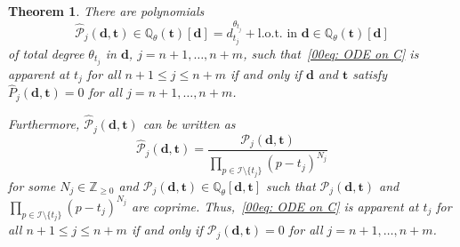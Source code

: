 \documentclass[10pt,a4paper]{amsart}
\numberwithin{equation}{section}
\newtheorem{Theorem}{Theorem}[section]
\def\Q{\mathbb Q}
\def\bt{\boldsymbol t}
\begin{document}
\begin{Theorem} \label{prop: apparent}
 There are polynomials
 \[
 \hat{\mathcal{P}}_j(\boldsymbol d,\boldsymbol t)\in\Q_\theta(\bt)[\boldsymbol d]=d_{t_{j}}^{\theta_{t_j}}+ \text{l.o.t.\ in $\boldsymbol d$} \in \Q_\theta(\boldsymbol t)[\boldsymbol d]
 \]
 of total degree $\theta_{t_j}$ in $\boldsymbol d$, $j=n+1,\dots,n+m$,
 such that~\eqref{00eq: ODE on C}
 is apparent at $t_j$ for all $n+1\leq j\leq n+m$ if
 and only if $\boldsymbol{d}$ and $\bt$ satisfy $\hat{P}_j(\boldsymbol{d},\bt)=0$ for all
 $j=n+1,\dots,n+m$.

 Furthermore,
 $\hat{\mathcal{P}}_j(\boldsymbol{d},\bt)$ can be written as
 \begin{equation}\label{e22q:PP}\hat{\mathcal{P}}_j(\boldsymbol{d},\bt)=\frac{\mathcal{P}_j(\boldsymbol{d},\bt)}
 {\prod_{p\in\mathcal{I}\setminus\{t_j\}}(p-t_j)^{N_j}}\end{equation}
 for some $N_j\in\mathbb{Z}_{\geq 0}$ and $\mathcal{P}_j(\boldsymbol{d},\bt)\in \Q_{\theta}[\boldsymbol{d},\bt]$ such that $\mathcal{P}_j(\boldsymbol{d},\bt)$ and $\prod_{p\in\mathcal{I}\setminus\{t_j\}}(p-t_j)^{N_j}$ are coprime. Thus,~\eqref{00eq: ODE on C}
 is apparent at $t_j$ for all $n+1\leq j\leq n+m$ if
 and only if $\mathcal{P}_j(\boldsymbol{d},\bt)=0$ for all
 $j=n+1,\dots,n+m$.
\end{Theorem}
\end{document}
